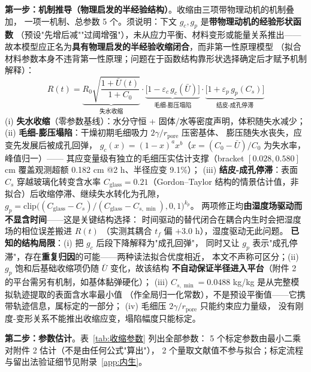\documentclass[12pt,a4paper]{ctexart}
\numberwithin{equation}{section}
\begin{document}
\textbf{第一步：机制推导（物理启发的半经验结构）}。收缩由三项带物理动机的机制叠加，
一项一机制、总参数 5 个。须说明：下文 $g_c,g_p$ 是\textbf{带物理动机的经验形状函数}
（预设"先增后减""过阈增强"），未从应力平衡、材料变形或能量关系推出——
故本模型应正名为\textbf{具有物理启发的半经验收缩闭合}，而非第一性原理模型
（拟合材料参数本身不违背第一性原理；问题在于函数结构靠形状选择确定后才赋予机制解释）：
\begin{equation}
R(t)=\underbrace{R_0\sqrt{\frac{1+\bar U(t)}{1+C_0}}}_{\text{失水收缩}}\cdot
\underbrace{\big[1-\varepsilon_c\,g_c(\bar U)\big]}_{\text{毛细-膨压塌陷}}\cdot
\underbrace{\big[1+\varepsilon_p\,g_p(C_s)\big]}_{\text{结皮-成孔停滞}}
\label{eq:收缩闭合}
\end{equation}
(i) \textbf{失水收缩}（零参数基线）：水分守恒 + 固体/水等密度声明，体积随失水减少；
(ii) \textbf{毛细-膨压塌陷}：干燥初期毛细吸力 $2\gamma/r_{\mathrm{pore}}$ 压密基体、
膨压随失水丧失，应变先发展后被成孔回弹，
$g_c(x)=(1-x)^{a}x^{b}$（$x=(C_0-\bar U)/C_0$ 为失水率，峰值归一）——
其应变量级有独立的毛细压实估计支撑（bracket $[0.028,0.580]$ cm 覆盖观测超额
0.182 cm @2 h、半径应变 9.1\%）；
(iii) \textbf{结皮-成孔停滞}：表面 $C_s$ 穿越玻璃化转变含水率
$C_{\mathrm{glass}}=0.21$（Gordon--Taylor 结构的情景估计值，非拟合）后收缩停滞、继续失水转化为孔隙，
$g_p=\mathrm{clip}\big((C_{\mathrm{glass}}-C_s)/(C_{\mathrm{glass}}-C_{s,\min}),0,1\big)^{k_p}$。
两项修正均\textbf{由湿度场驱动而不显含时间}——这是关键结构选择：
时间驱动的替代闭合在耦合内生时会把湿度场的相位误差搬进 $R(t)$
（实测其耦合 $t_f$ 偏 $+3.0$ h），湿度驱动无此问题。
\textbf{已知的结构局限}：(i) 把 $g_c$ 后段下降解释为"成孔回弹"，
同时又让 $g_p$ 表示"成孔停滞"，存在\textbf{重复归因}的可能——两种读法拟合优度相近，
本文不声称可区分；(ii) $g_p$ 饱和后基础收缩项仍随 $\bar U$ 变化，故该结构
\textbf{不自动保证半径进入平台}（附件 2 的平台需另有机制，如基体黏弹硬化）；
(iii) $C_{s,\min}=0.0488$ kg/kg 是从完整模拟轨迹提取的表面含水率最小值
（作全局归一化常数），不是预设平衡值——它携带轨迹信息，属标定的一部分；
(iv) 毛细压 $2\gamma/r_{\mathrm{pore}}$ 只能约束应力量级，
没有刚度-变形关系不能推出收缩应变，塌陷幅度只能标定。

\textbf{第二步：参数估计}。表~\ref{tab:收缩参数} 列出全部参数：
5 个标定参数由最小二乘对附件 2 估计（不是由任何公式"算出"），
2 个量取文献值不参与拟合；标定流程与留出法验证细节见附录~\ref{app:内生}。
\end{document}

